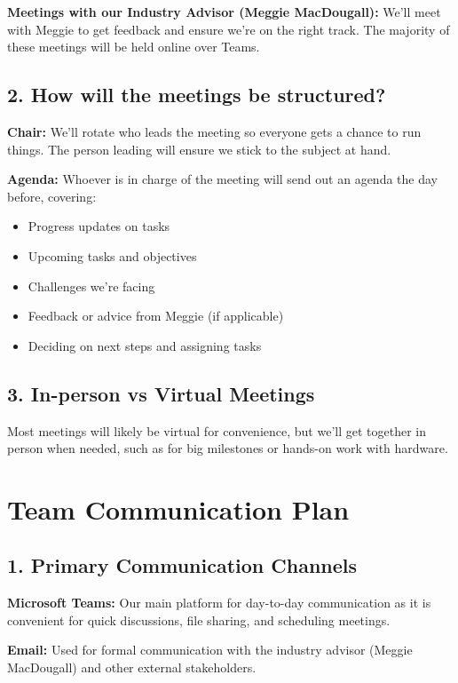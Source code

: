 \documentclass{article}
\begin{document}
\textbf{Meetings with our Industry Advisor (Meggie MacDougall):} We’ll meet with Meggie to get feedback and ensure we’re on the right track. The majority of these meetings will be held online over Teams.

\subsection*{2. How will the meetings be structured?}
\textbf{Chair:} We’ll rotate who leads the meeting so everyone gets a chance to run things. The person leading will ensure we stick to the subject at hand.

\textbf{Agenda:} Whoever is in charge of the meeting will send out an agenda the day before, covering:
\begin{itemize}
    \item Progress updates on tasks
    \item Upcoming tasks and objectives
    \item Challenges we’re facing
    \item Feedback or advice from Meggie (if applicable)
    \item Deciding on next steps and assigning tasks
\end{itemize}

\subsection*{3. In-person vs Virtual Meetings}
Most meetings will likely be virtual for convenience, but we’ll get together in person when needed, such as for big milestones or hands-on work with hardware.


\section{Team Communication Plan}

\subsection*{1. Primary Communication Channels}
\textbf{Microsoft Teams:} Our main platform for day-to-day communication as it is convenient for quick discussions, file sharing, and scheduling meetings.

\textbf{Email:} Used for formal communication with the industry advisor (Meggie MacDougall) and other external stakeholders.
\end{document}
